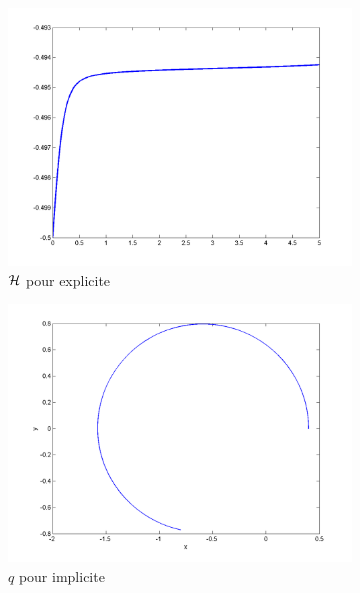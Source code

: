 \begin{figure}
\begin{subfigure}[b]{0.3\textwidth}
    \includegraphics[width=\textwidth]{images/Q1_explicite_H.png}
    \caption{$\mathcal{H}$ pour explicite}
    \label{fig:q1_explicite_H}
  \end{subfigure}
  \begin{subfigure}[b]{0.3\textwidth}
    \includegraphics[width=\textwidth]{images/Q1_implicite_q.png}
    \caption{$q$ pour implicite}
    \label{fig:q1_implicite_q}
  \end{subfigure}%
  ~
  \begin{subfigure}[b]{0.3\textwidth}

\end{subfigure}
\end{figure}
